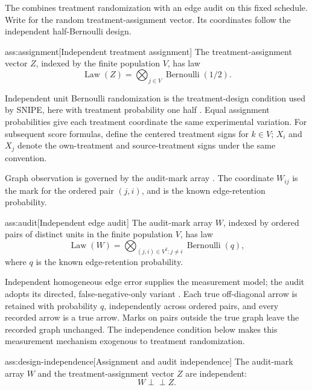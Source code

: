 The  combines treatment randomization with an edge audit on this fixed schedule. Write  for the random treatment-assignment vector. Its coordinates follow the independent half-Bernoulli design.

\begin{assumptionv}{ass:assignment}[Independent treatment assignment]
The treatment-assignment vector \(Z\), indexed by the finite population \(V\), has law
\[
\operatorname{Law}(Z)
=
\bigotimes_{j\in V}\operatorname{Bernoulli}(1/2).
\]
\end{assumptionv}

Independent unit Bernoulli randomization is the treatment-design condition used by SNIPE, here with treatment probability one half \citep{CortezRodriguezEichhornYu2023SNIPE}. Equal assignment probabilities give each treatment coordinate the same experimental variation. For subsequent score formulas, define the centered treatment signs  for \(k\in V\); \(X_i\) and \(X_j\) denote the own-treatment and source-treatment signs under the same convention.

Graph observation is governed by the audit-mark array . The coordinate \(W_{ij}\) is the mark for the ordered pair \((j,i)\), and  is the known edge-retention probability.

\begin{assumptionv}{ass:audit}[Independent edge audit]
The audit-mark array \(W\), indexed by ordered pairs of distinct units in the finite population \(V\), has law
\[
\operatorname{Law}(W)
=
\bigotimes_{(j,i)\in V^2:j\ne i}\operatorname{Bernoulli}(q),
\]
where \(q\) is the known edge-retention probability.
\end{assumptionv}

Independent homogeneous edge error supplies the measurement model; the audit adopts its directed, false-negative-only variant \citep{LiSussmanKolaczyk2021NetworkNoise}. Each true off-diagonal arrow is retained with probability \(q\), independently across ordered pairs, and every recorded arrow is a true arrow. Marks on pairs outside the true graph leave the recorded graph unchanged. The independence condition below makes this measurement mechanism exogenous to treatment randomization.

\begin{assumptionv}{ass:design-independence}[Assignment and audit independence]
The audit-mark array \(W\) and the treatment-assignment vector \(Z\) are independent:
\[
W\mathbin{\perp\!\!\!\perp}Z.
\]
\end{assumptionv}

